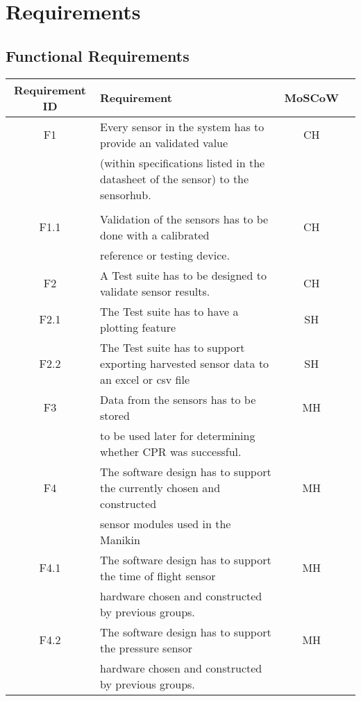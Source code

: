 \chapter{Requirements}
\label{chapter:intro}
\section{Functional Requirements}
\begin{tabular}{ |c|l|c|c| } 
 \hline
 Requirement ID & Requirement & MoSCoW \\ 
 \hline
 \hline
 F1    & Every sensor in the system has to provide an validated value  & CH \\ 
       & (within specifications listed in the datasheet of the sensor) to the sensorhub.  &  \\
       &                                                                                  &  \\
\hline
 F1.1  & Validation of the sensors has to be done with a calibrated                       & CH \\
       & reference or testing device.                                                     &   \\
\hline
 F2    & A Test suite has to be designed to validate sensor results.                      & CH \\
 \hline
 F2.1  & The Test suite has to have a plotting feature                                    & SH \\
 \hline 
 F2.2  & The Test suite has to support exporting harvested sensor data to an excel or csv file & SH \\
 \hline
 F3    & Data from the sensors has to be stored & MH\\
       & to be used later for determining whether CPR was successful.  & \\
\hline
 F4    & The software design has to support the currently chosen and constructed & MH  \\
       & sensor modules used in the Manikin & \\
 \hline
 F4.1  & The software design has to support the time of flight sensor & MH \\
       & hardware chosen and constructed by previous groups. & \\
\hline
 F4.2  & The software design has to support the pressure sensor & MH \\
       & hardware chosen and constructed by previous groups. & \\
\hline

\end{tabular}

